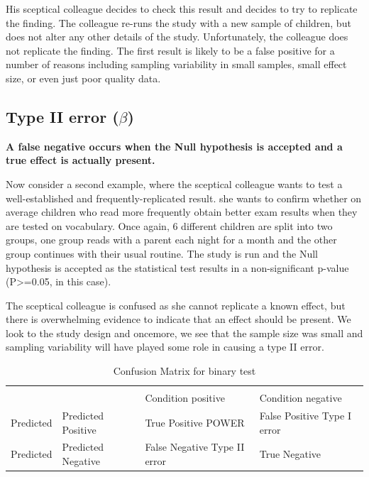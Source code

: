 \documentclass[]{book}
\begin{document}
His sceptical colleague decides to check this result and decides to try to replicate the finding. The colleague re-runs the study with a new sample of children, but does not alter any other details of the study. Unfortunately, the colleague does not replicate the finding. The first result is likely to be a false positive for a number of reasons including sampling variability in small samples, small effect size, or even just poor quality data.

\hypertarget{type-ii-error-beta}{%
\subsection{\texorpdfstring{Type II error (\(\beta\))}{Type II error (\textbackslash{}beta)}}\label{type-ii-error-beta}}

\textbf{A false negative occurs when the Null hypothesis is accepted and a true effect is actually present.}

Now consider a second example, where the sceptical colleague wants to test a well-established and frequently-replicated result. she wants to confirm whether on average children who read more frequently obtain better exam results when they are tested on vocabulary. Once again, 6 different children are split into two groups, one group reads with a parent each night for a month and the other group continues with their usual routine. The study is run and the Null hypothesis is accepted as the statistical test results in a non-significant p-value (P\textgreater{}=0.05, in this case).

The sceptical colleague is confused as she cannot replicate a known effect, but there is overwhelming evidence to indicate that an effect should be present. We look to the study design and oncemore, we see that the sample size was small and sampling variability will have played some role in causing a type II error.

\begin{table}[t]

\caption{\label{tab:confusionMat}Confusion Matrix for binary test}
\centering
\begin{tabular}{>{\centering\arraybackslash}p{9em}>{\centering\arraybackslash}p{9em}>{\centering\arraybackslash}p{9em}>{\centering\arraybackslash}p{9em}}
\toprule
\multicolumn{1}{c}{ } & \multicolumn{1}{c}{ } & \multicolumn{2}{c}{True} \\
\cmidrule(l{3pt}r{3pt}){3-4}
 &  & Condition positive & Condition negative\\
\midrule
Predicted & Predicted Positive & True Positive 
 POWER & False Positive 
\rowcolor{gray!6}   Type I error\\
Predicted & Predicted Negative & False Negative 
 Type II error & True Negative\\
\bottomrule
\end{tabular}
\end{table}
\end{document}
